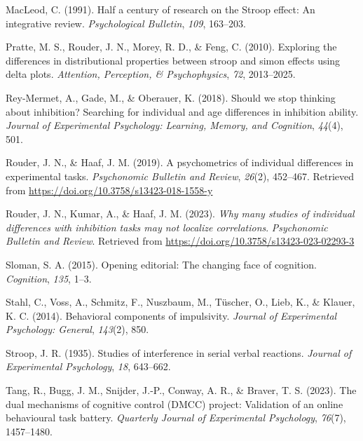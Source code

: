 \documentclass[
  man,floatsintext]{apa6}
\newlength{\cslhangindent}
\newlength{\cslentryspacingunit} %
\newenvironment{CSLReferences}[2] %
 {%
  \setlength{\parindent}{0pt}
  \ifodd #1
  \let\oldpar\par
  \def\par{\hangindent=\cslhangindent\oldpar}
  \fi
  \setlength{\parskip}{#2\cslentryspacingunit}
 }%
 {}
\begin{document}
\begin{CSLReferences}{1}{0}
\leavevmode{}%
MacLeod, C. (1991). Half a century of research on the {S}troop effect: {A}n integrative review. \emph{Psychological Bulletin}, \emph{109}, 163--203.

\leavevmode{}%
Pratte, M. S., Rouder, J. N., Morey, R. D., \& Feng, C. (2010). Exploring the differences in distributional properties between stroop and simon effects using delta plots. \emph{Attention, Perception, \& Psychophysics}, \emph{72}, 2013--2025.

\leavevmode{}%
Rey-Mermet, A., Gade, M., \& Oberauer, K. (2018). Should we stop thinking about inhibition? Searching for individual and age differences in inhibition ability. \emph{Journal of Experimental Psychology: Learning, Memory, and Cognition}, \emph{44}(4), 501.

\leavevmode{}%
Rouder, J. N., \& Haaf, J. M. (2019). A psychometrics of individual differences in experimental tasks. \emph{Psychonomic Bulletin and Review}, \emph{26}(2), 452--467. Retrieved from \url{https://doi.org/10.3758/s13423-018-1558-y}

\leavevmode{}%
Rouder, J. N., Kumar, A., \& Haaf, J. M. (2023). \emph{Why many studies of individual differences with inhibition tasks may not localize correlations}. \emph{Psychonomic Bulletin and Review}. Retrieved from \url{https://doi.org/10.3758/s13423-023-02293-3}

\leavevmode{}%
Sloman, S. A. (2015). Opening editorial: The changing face of cognition. \emph{Cognition}, \emph{135}, 1--3.

\leavevmode{}%
Stahl, C., Voss, A., Schmitz, F., Nuszbaum, M., Tüscher, O., Lieb, K., \& Klauer, K. C. (2014). Behavioral components of impulsivity. \emph{Journal of Experimental Psychology: General}, \emph{143}(2), 850.

\leavevmode{}%
Stroop, J. R. (1935). Studies of interference in serial verbal reactions. \emph{Journal of Experimental Psychology}, \emph{18}, 643--662.

\leavevmode{}%
Tang, R., Bugg, J. M., Snijder, J.-P., Conway, A. R., \& Braver, T. S. (2023). The dual mechanisms of cognitive control (DMCC) project: Validation of an online behavioural task battery. \emph{Quarterly Journal of Experimental Psychology}, \emph{76}(7), 1457--1480.


\end{CSLReferences}
\end{document}
